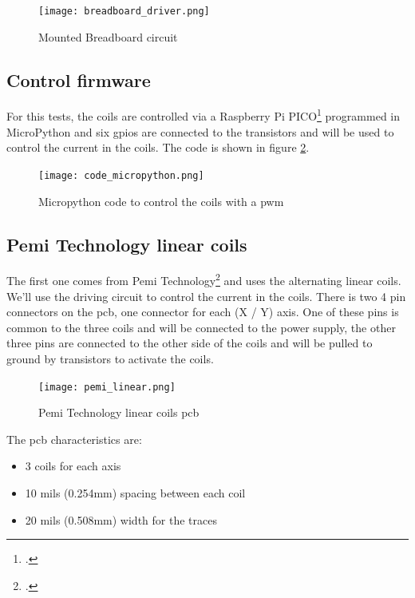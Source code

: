 \begin{figure}[H]
	\centering
	\texttt{[image: breadboard\_driver.png]}
	\caption[Mounted Breadboard circuit]{Mounted Breadboard circuit}
	\label{fig:breadboard_driver}
\end{figure}

\subsection{Control firmware}

For this tests, the coils are controlled via a Raspberry Pi PICO\footcite{ltd_buy_nodate} programmed in MicroPython and six \gls{gpio}s are connected to the transistors and will be used to control the current in the coils. The code is shown in figure \ref{fig:up_code}.

\begin{figure}[H]
	\centering
	\texttt{[image: code\_micropython.png]}
	\caption[Micropython code to control the coils with a \gls{pwm}]{Micropython code to control the coils with a \gls{pwm}}
	\label{fig:up_code}
\end{figure}

\subsection{Pemi Technology linear coils}

The first one comes from Pemi Technology\footcite{noauthor_home_nodate} and uses the alternating linear coils. We'll use the driving circuit to control the current in the coils. There is two 4 pin connectors on the \gls{pcb}, one connector for each (X / Y) axis. One of these pins is common to the three coils and will be connected to the power supply, the other three pins are connected to the other side of the coils and will be pulled to ground by transistors to activate the coils.

\begin{figure}[H]
	\centering
	\texttt{[image: pemi\_linear.png]}
	\caption[Pemi Technology linear coils \gls{pcb}]{Pemi Technology linear coils \gls{pcb}}
	\label{fig:pemi_pcb}
\end{figure}

The \gls{pcb} characteristics are:
\begin{itemize}
	\item 3 coils for each axis
	\item 10 mils (0.254mm) spacing between each coil
	\item 20 mils (0.508mm) width for the traces
\end{itemize}

